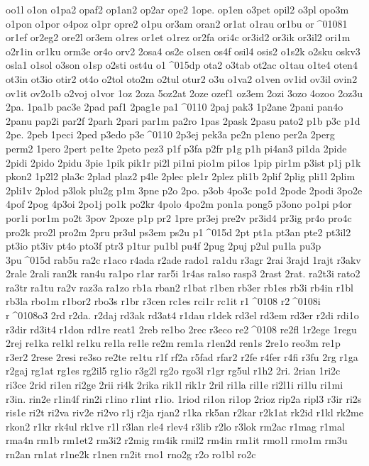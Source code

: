 {oo1l
o1on
o1pa2
opaf2
op1an2
op2ar
ope2
1ope.
op1en
o3pet
opil2
o3pl
opo3m
o1pon
o1por
o4poz
o1pr
opre2
o1pu
or3am
oran2
or1at
o1rau
or1bu
or^^^^01081
or1ef
or2eg2
ore2l
or3em
o1res
or1et
o1rez
or2fa
ori4c
or3id2
or3ik
or3il2
ori1m
o2r1in
or1ku
orm3e
or4o
orv2
2osa4
os2e
o1sen
os4f
osil4
osis2
o1s2k
o2sku
oskv3
osla1
o1sol
o3son
o1sp
o2sti
ost4u
o1^^^^015dp
ota2
o3tab
ot2ac
o1tau
o1te4
oten4
ot3in
ot3io
otir2
ot4o
o2tol
oto2m
o2tul
otur2
o3u
o1va2
o1ven
ov1id
ov3il
ovin2
ov1it
ov2o1b
o2voj
o1vor
1oz
2oza
5oz2at
2oze
ozef1
oz3em
2ozi
3ozo
4ozoo
2oz3u
2pa.
1pa1b
pac3e
2pad
paf1
2pag1e
pa1^^^^0110
2paj
pak3
1p2ane
2pani
pan4o
2panu
pap2i
par2f
2parh
2pari
par1m
pa2ro
1pas
2pask
2pasu
pato2
p1b
p3c
p1d
2pe.
2peb
1peci
2ped
p3edo
p3e^^^^0110
2p3ej
pek3a
pe2n
p1eno
per2a
2perg
perm2
1pero
2pert
pe1te
2peto
pez3
p1f
p3fa
p2fr
p1g
p1h
pi4an3
pi1da
2pide
2pidi
2pido
2pidu
3pie
1pik
pik1r
pi2l
pi1ni
pio1m
pi1os
1pip
pir1m
p3ist
p1j
p1k
pkon2
1p2l2
pla3c
2plad
plaz2
p4le
2plec
ple1r
2plez
pli1b
2plif
2plig
pli1l
2plim
2pli1v
2plod
p3lok
plu2g
p1m
3pne
p2o
2po.
p3ob
4po3c
po1d
2pode
2podi
3po2e
4pof
2pog
4p3oi
2po1j
po1k
po2kr
4polo
4po2m
pon1a
pong5
p3ono
po1pi
p4or
por1i
por1m
po2t
3pov
2poze
p1p
pr2
1pre
pr3ej
pre2v
pr3id4
pr3ig
pr4o
pro4c
pro2k
pro2l
pro2m
2pru
pr3ul
ps3em
ps2u
p1^^^^015d
2pt
pt1a
pt3an
pte2
pt3il2
pt3io
pt3iv
pt4o
pto3f
ptr3
p1tur
pu1bl
pu4f
2pug
2puj
p2ul
pu1la
pu3p
3pu^^^^015d
rab5u
ra2c
r1aco
r4ada
r2ade
rado1
ra1du
r3agr
2rai
3rajd
1rajt
r3akv
2rale
2rali
ran2k
ran4u
ra1po
r1ar
rar5i
1r4as
ra1so
rasp3
2rast
2rat.
ra2t3i
rato2
ra3tr
ra1tu
ra2v
raz3a
ra1zo
rb1a
rban2
r1bat
r1ben
rb3er
rb1es
rb3i
rb4in
r1bl
rb3la
rbo1m
r1bor2
rbo3s
r1br
r3cen
rc1es
rci1r
rc1it
r1^^^^0108
r2^^^^0108i
r^^^^0108o3
2rd
r2da.
r2daj
rd3ak
rd3at4
r1dau
r1dek
rd3el
rd3em
rd3er
r2di
rdi1o
r3dir
rd3it4
r1don
rd1re
reat1
2reb
re1bo
2rec
r3eco
re2^^^^0108
re2fl
1r2ege
1regu
2rej
re1ka
re1kl
re1ku
re1la
re1le
re2m
rem1a
r1en2d
ren1s
2re1o
reo3m
re1p
r3er2
2rese
2resi
re3so
re2te
re1tu
r1f
rf2a
r5fad
rfar2
r2fe
r4fer
r4fi
r3fu
2rg
r1ga
r2gaj
rg1at
rg1es
rg2il5
rg1io
r3g2l
rg2o
rgo3l
r1gr
rg5ul
r1h2
2ri.
2rian
1ri2c
ri3ce
2rid
ri1en
ri2ge
2rii
ri4k
2rika
rik1l
rik1r
2ril
ri1la
ril1e
ri2l1i
ri1lu
ri1mi
r3in.
rin2e
r1in4f
rin2i
r1ino
r1int
r1io.
1riod
ri1on
ri1op
2rioz
rip2a
ripl3
r3ir
ri2s
ris1e
ri2t
ri2va
riv2e
ri2vo
r1j
r2ja
rjan2
r1ka
rk5an
r2kar
r2k1at
rk2id
r1kl
rk2me
rkon2
r1kr
rk4ul
rk1ve
r1l
r3lan
rle4
rlev4
r3lib
r2lo
r3lok
rm2ac
r1mag
r1mal
rma4n
rm1b
rm1et2
rm3i2
r2mig
rm4ik
rmil2
rm4in
rm1it
rmo1l
rmo1m
rm3u
rn2an
rn1at
r1ne2k
r1nen
rn2it
rno1
rno2g
r2o
ro1bl
ro2c
}
